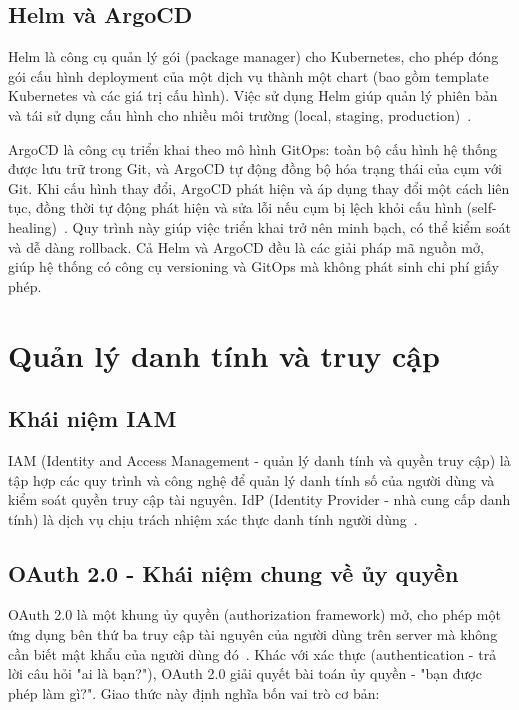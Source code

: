 \documentclass[../BTL.tex]{subfiles}
\begin{document}
\subsection{Helm và ArgoCD}
\label{section:1.7.3}

Helm là công cụ quản lý gói (package manager) cho Kubernetes, cho phép đóng gói cấu hình deployment của một dịch vụ thành một chart (bao gồm template Kubernetes và các giá trị cấu hình). Việc sử dụng Helm giúp quản lý phiên bản và tái sử dụng cấu hình cho nhiều môi trường (local, staging, production)~\cite{helmdocs}.

ArgoCD là công cụ triển khai theo mô hình GitOps: toàn bộ cấu hình hệ thống được lưu trữ trong Git, và ArgoCD tự động đồng bộ hóa trạng thái của cụm với Git. Khi cấu hình thay đổi, ArgoCD phát hiện và áp dụng thay đổi một cách liên tục, đồng thời tự động phát hiện và sửa lỗi nếu cụm bị lệch khỏi cấu hình (self-healing)~\cite{argocddocs}. Quy trình này giúp việc triển khai trở nên minh bạch, có thể kiểm soát và dễ dàng rollback. Cả Helm và ArgoCD đều là các giải pháp mã nguồn mở, giúp hệ thống có công cụ versioning và GitOps mà không phát sinh chi phí giấy phép.

\section{Quản lý danh tính và truy cập}
\label{section:1.8}

\subsection{Khái niệm IAM}
\label{section:1.8.1}

IAM (Identity and Access Management - quản lý danh tính và quyền truy cập) là tập hợp các quy trình và công nghệ để quản lý danh tính số của người dùng và kiểm soát quyền truy cập tài nguyên. IdP (Identity Provider - nhà cung cấp danh tính) là dịch vụ chịu trách nhiệm xác thực danh tính người dùng~\cite{keycloakdocs}.

\subsection{OAuth 2.0 - Khái niệm chung về ủy quyền}
\label{section:1.8.2}

OAuth 2.0 là một khung ủy quyền (authorization framework) mở, cho phép một ứng dụng bên thứ ba truy cập tài nguyên của người dùng trên server mà không cần biết mật khẩu của người dùng đó~\cite{rfc6749}. Khác với xác thực (authentication - trả lời câu hỏi "ai là bạn?"), OAuth 2.0 giải quyết bài toán ủy quyền - "bạn được phép làm gì?". Giao thức này định nghĩa bốn vai trò cơ bản:
\end{document}
